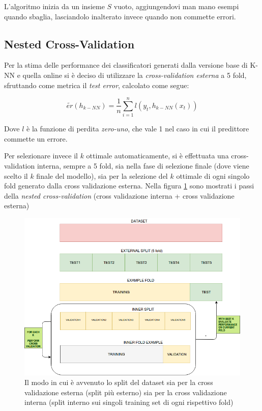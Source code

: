 \documentclass[fleqn,10pt]{SelfArx} %
\begin{document}
L'algoritmo inizia da un insieme $S$ vuoto, aggiungendovi man mano esempi quando sbaglia, lasciandolo inalterato invece quando non commette errori.

\subsection{Nested Cross-Validation}
Per la stima delle performance dei classificatori generati dalla versione base di K-NN e quella online si è deciso di utilizzare la \emph{cross-validation esterna} a 5 fold, sfruttando come metrica il \emph{test error}, calcolato come segue:

\[\widetilde{er}(h_{k-NN})=\frac{1}{n}\sum_{i=1}^{n} l(y_t,h_{k-NN}(x_t))\]

Dove $l$ è la funzione di perdita \emph{zero-uno}, che vale 1 nel caso in cui il predittore commette un errore.
\newline

Per selezionare invece il $k$ ottimale automaticamente, si è effettuata una cross-validation interna, sempre a 5 fold, sia nella fase di selezione finale (dove viene scelto il $k$ finale del modello), sia per la selezione del $k$ ottimale di ogni singolo fold generato dalla cross validazione esterna. Nella figura \ref{cross} sono mostrati i passi della \emph{nested cross-validation} (cross validazione interna + cross validazione esterna)
\begin{figure}
\includegraphics[scale=0.33]{cross.png}
\caption{\footnotesize{Il modo in cui è avvenuto lo split del dataset sia per la cross validazione esterna (split più esterno) sia per la cross validazione interna (split interno sui singoli training set di ogni rispettivo fold)}}
\label{cross}
\end{figure}
\end{document}
